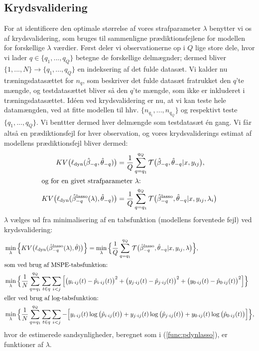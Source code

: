 \documentclass[11pt,a4paper]{article}
\begin{document}
\subsection{Krydsvalidering}
For at identificere den optimale størrelse af vores strafparameter $\lambda$ benytter vi os af krydsvalidering, som bruges til sammenligne prædiktionsfejlene for modellen for forskellige $\lambda$ værdier. Først deler vi observationerne op i $Q$ lige store dele, hvor vi lader $q\in \{q_1,...,q_Q\}$ betegne de forskellige delmægnder; dermed bliver $\{1,...,N\}\rightarrow\{q_1,...,q_Q\}$ en indeksering af det fulde datasæt. Vi kalder nu træningsdatasættet for $n_q$, som beskriver det fulde datasæt fratrukket den $q$'te mængde, og testdatasættet bliver så den $q$'te mængde, som ikke er inkluderet i træningsdatasættet. Idéen ved krydsvalidering er nu, at vi kan teste hele datamængden, ved at fitte modellen til hhv. $\{n_{q_1},...,n_{q_Q}\}$ og respektivt teste $\{q_1,...,q_Q\}$. Vi benttter dermed hver delmængde som testdatasæt én gang. Vi får altså en prædiktionsfejl for hver observation, og vores krydsvaliderings estimat af modellens prædiktionsfejl bliver dermed:
\begin{align*}
KV\big{(}\ell_{\text{dyn}}(\hat{\beta}_{-q},\hat{\theta}_{-q})\big{)}&=\frac{1}{Q}\sum_{q=q_1}^{q_Q}\mathcal{T}\big{(}\hat{\beta}_{-q},\hat{\theta}_{-q}|x,y_{ij}\big{)},\\
\intertext{og for en givet strafparameter $\lambda$:}
KV\big{(}\ell_{\text{dyn}}(\hat{\beta}_{-q}^{\text{lasso}}(\lambda),\hat{\theta}_{-q})\big{)}&=\frac{1}{Q}\sum_{q=q_1}^{q_Q}\mathcal{T}\big{(}\hat{\beta}_{-q}^{\text{lasso}},\hat{\theta}_{-q}|x,y_{ij},\lambda_i\big{)}
\end{align*}
$\lambda$ vælges ud fra minimalisering af en tabsfunktion (modellens forventede fejl) ved krydsvalidering:
\begin{align*}
&\min_{\lambda}\Big{\{}KV\big{(}\ell_{\text{dyn}}(\hat{\beta}_{-q}^{\text{lasso}}(\lambda),\hat{\theta})\big{)}\Big{\}}=\min_{\lambda}\Big{\{}\frac{1}{Q}\sum_{q=q_1}^{q_Q}\mathcal{T}\big{(}\hat{\beta}_{-q}^{\text{lasso}},\hat{\theta}_{-q}|x,y_{ij},\lambda\big{)}\Big{\}},\\
\intertext{som ved brug af MSPE-tabsfunktion:}
&\min_{\lambda}\Big{\{}\frac{1}{N}\sum_{q=q_1}^{q_Q}\sum_{t\in q}\sum_{i<j}\Big{[}\big{(}y_{i\cdot ij}(t)-\hat{p}_{i\cdot ij}(t)\big{)}^2+\big{(}y_{j\cdot ij}(t)-\hat{p}_{j\cdot ij}(t)\big{)}^2+\big{(}y_{0\cdot ij}(t)-\hat{p}_{0\cdot ij}(t)\big{)}^2\Big{]}\Big{\}}\\
\intertext{eller ved brug af log-tabsfunktion:}
&\min_{\lambda}\Big{\{}\frac{1}{N}\sum_{q=q_1}^{q_Q}\sum_{t\in q}\sum_{i<j}-\Big{[}y_{i\cdot ij}(t)\log\big{(}\hat{p}_{i\cdot ij}(t)\big{)}+y_{j\cdot ij}(t)\log\big{(}\hat{p}_{j\cdot ij}(t)\big{)}+y_{0\cdot ij}(t)\log\big{(}\hat{p}_{0\cdot ij}(t)\big{)}\Big{]}\Big{\}},
\end{align*}
hvor de estimerede sandsynligheder, beregnet som i (\ref{func:pdynlasso}), er funktioner af $\lambda$.
\end{document}
